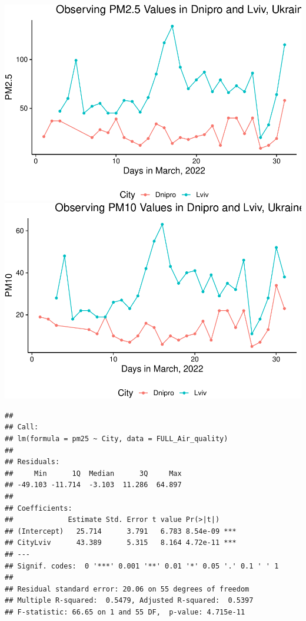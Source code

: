 \documentclass[
  12pt,
]{article}
\begin{document}
\includegraphics{Fontanie_Gordon_Weinberg_Project_files/figure-latex/Plotting Lviv vs Dnipro-1.pdf}
\includegraphics{Fontanie_Gordon_Weinberg_Project_files/figure-latex/Plotting Lviv vs Dnipro-2.pdf}

\begin{verbatim}
## 
## Call:
## lm(formula = pm25 ~ City, data = FULL_Air_quality)
## 
## Residuals:
##     Min      1Q  Median      3Q     Max 
## -49.103 -11.714  -3.103  11.286  64.897 
## 
## Coefficients:
##             Estimate Std. Error t value Pr(>|t|)    
## (Intercept)   25.714      3.791   6.783 8.54e-09 ***
## CityLviv      43.389      5.315   8.164 4.72e-11 ***
## ---
## Signif. codes:  0 '***' 0.001 '**' 0.01 '*' 0.05 '.' 0.1 ' ' 1
## 
## Residual standard error: 20.06 on 55 degrees of freedom
## Multiple R-squared:  0.5479, Adjusted R-squared:  0.5397 
## F-statistic: 66.65 on 1 and 55 DF,  p-value: 4.715e-11
\end{verbatim}
\end{document}
